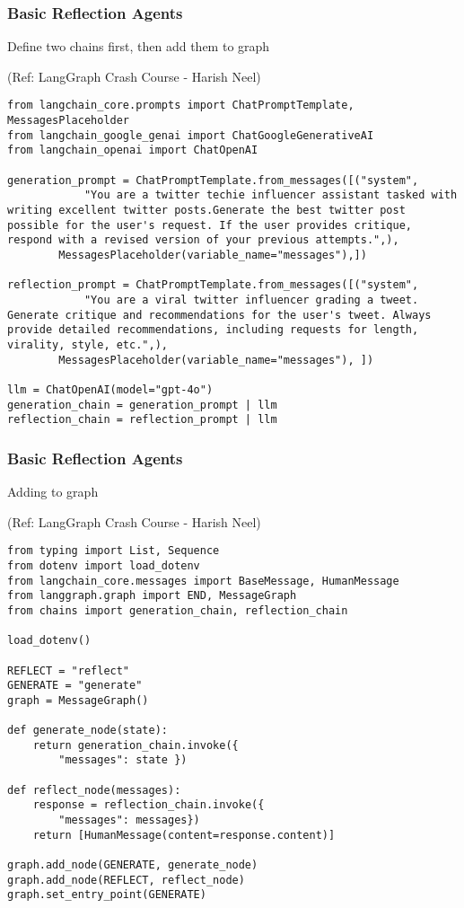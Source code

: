 \begin{frame}[fragile]\frametitle{Basic Reflection Agents}

Define two chains first, then add them to graph

{\tiny (Ref: LangGraph Crash Course - Harish Neel)}

\begin{lstlisting}[basicstyle=\scriptsize\ttfamily]
from langchain_core.prompts import ChatPromptTemplate, MessagesPlaceholder
from langchain_google_genai import ChatGoogleGenerativeAI
from langchain_openai import ChatOpenAI

generation_prompt = ChatPromptTemplate.from_messages([("system",
            "You are a twitter techie influencer assistant tasked with writing excellent twitter posts.Generate the best twitter post possible for the user's request. If the user provides critique, respond with a revised version of your previous attempts.",),
        MessagesPlaceholder(variable_name="messages"),])

reflection_prompt = ChatPromptTemplate.from_messages([("system",
            "You are a viral twitter influencer grading a tweet. Generate critique and recommendations for the user's tweet. Always provide detailed recommendations, including requests for length, virality, style, etc.",),
		MessagesPlaceholder(variable_name="messages"), ])

llm = ChatOpenAI(model="gpt-4o")
generation_chain = generation_prompt | llm
reflection_chain = reflection_prompt | llm
  \end{lstlisting}
  
  

\end{frame}

\begin{frame}[fragile]\frametitle{Basic Reflection Agents}

Adding to graph

{\tiny (Ref: LangGraph Crash Course - Harish Neel)}

\begin{lstlisting}[basicstyle=\scriptsize\ttfamily]
from typing import List, Sequence
from dotenv import load_dotenv
from langchain_core.messages import BaseMessage, HumanMessage
from langgraph.graph import END, MessageGraph
from chains import generation_chain, reflection_chain

load_dotenv()

REFLECT = "reflect"
GENERATE = "generate"
graph = MessageGraph()

def generate_node(state):
    return generation_chain.invoke({
        "messages": state })

def reflect_node(messages):
    response = reflection_chain.invoke({
        "messages": messages})
    return [HumanMessage(content=response.content)]

graph.add_node(GENERATE, generate_node)
graph.add_node(REFLECT, reflect_node)
graph.set_entry_point(GENERATE)
\end{lstlisting}
  
  

\end{frame}


